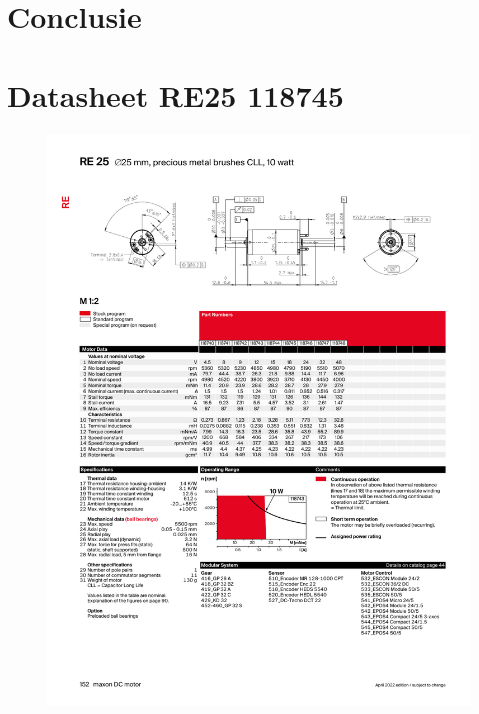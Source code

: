 \documentclass{article}
\begin{document}
\section*{Conclusie}


\newpage



\newpage
\appendix 

  \section{Datasheet RE25 118745}
    \label{app:datasheet motor}
    \begin{figure}[htbp]
      \centering %
      \includegraphics[page=1, clip, trim=0cm 0cm 0cm 0cm, scale = 0.65]{datasheet_RE25118745.pdf}
    \end{figure}
    \cite{Maxon}
\end{document}
